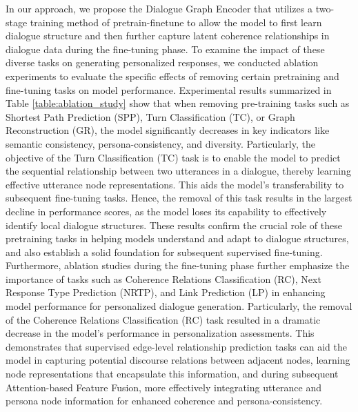 In our approach, we propose the Dialogue Graph Encoder that utilizes a two-stage training method of pretrain-finetune to allow the model to first learn dialogue structure and then further capture latent coherence relationships in dialogue data during the fine-tuning phase. To examine the impact of these diverse tasks on generating personalized responses, we conducted ablation experiments to evaluate the specific effects of removing certain pretraining and fine-tuning tasks on model performance. Experimental results summarized in Table \ref{table:ablation_study} show that when removing pre-training tasks such as Shortest Path Prediction (SPP), Turn Classification (TC), or Graph Reconstruction (GR), the model significantly decreases in key indicators like semantic consistency, persona-consistency, and diversity. Particularly, the objective of the Turn Classification (TC) task is to enable the model to predict the sequential relationship between two utterances in a dialogue, thereby learning effective utterance node representations. This aids the model's transferability to subsequent fine-tuning tasks. Hence, the removal of this task results in the largest decline in performance scores, as the model loses its capability to effectively identify local dialogue structures. These results confirm the crucial role of these pretraining tasks in helping models understand and adapt to dialogue structures, and also establish a solid foundation for subsequent supervised fine-tuning. Furthermore, ablation studies during the fine-tuning phase further emphasize the importance of tasks such as Coherence Relations Classification (RC), Next Response Type Prediction (NRTP), and Link Prediction (LP) in enhancing model performance for personalized dialogue generation. Particularly, the removal of the Coherence Relations Classification (RC) task resulted in a dramatic decrease in the model's performance in personalization assessments. This demonstrates that supervised edge-level relationship prediction tasks can aid the model in capturing potential discourse relations between adjacent nodes, learning node representations that encapsulate this information, and during subsequent Attention-based Feature Fusion, more effectively integrating utterance and persona node information for enhanced coherence and persona-consistency.

